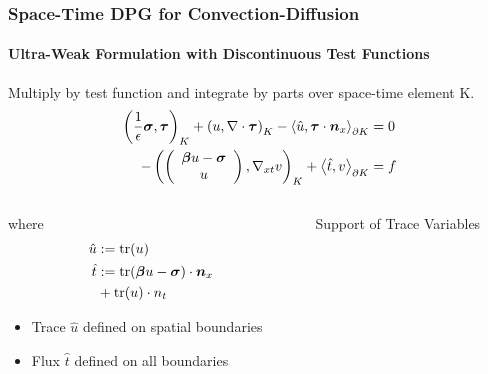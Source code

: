 \documentclass[18pt,xcolor=table]{beamer}
\begin{document}
\begin{frame}[t]
\frametitle{Space-Time DPG for Convection-Diffusion}
\framesubtitle{Ultra-Weak Formulation with Discontinuous Test Functions}  %
Multiply by test function and integrate by parts over space-time element K.
\begin{equation*}
\begin{aligned}
\left( \frac{1}{\epsilon}\boldsymbol\sigma,\boldsymbol\tau \right)_K+\left( u,\nabla\cdot\boldsymbol\tau \right)_K-\left\langle \hat u,\boldsymbol\tau\cdot\boldsymbol n_x \right\rangle_{\partial K}&=0\\
-\left( \left( \begin{array}{c} \boldsymbol\beta u-\boldsymbol\sigma\\ u\\ \end{array} \right),\nabla_{xt} v \right)_K+\left\langle \hat t,v \right\rangle_{\partial K}&=f
\end{aligned}
\end{equation*}
\begin{columns}[t] %
\begin{column}[T]{0.4\textwidth} %
\vspace{-3ex}
where
\vspace{-1ex}
\begin{align*}
\hat u&:=\operatorname*{tr}(u)\\
\hat t&:=\operatorname*{tr}(\boldsymbol\beta u-\boldsymbol\sigma)\cdot\boldsymbol n_x\\
&+\operatorname*{tr}(u)\cdot n_t
\end{align*}
\vspace{-4ex}
\begin{itemize}
  \item Trace $\hat u$ defined on spatial boundaries
  \item Flux $\hat t$ defined on all boundaries
\end{itemize}
\end{column}
\begin{column}[T]{0.6\textwidth} %
\vspace{-2ex}
\begin{block}{Support of Trace Variables}
\end{block}
\end{column}
\end{columns}
\end{frame}
\end{document}
